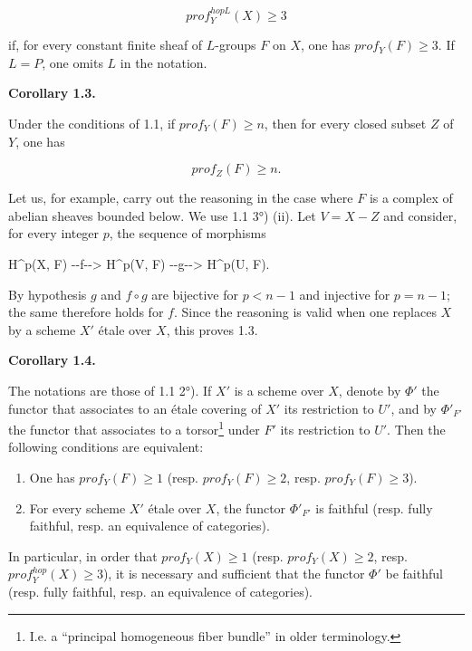 \documentclass[
]{article}
\newenvironment{Shaded}{}{}
\newcommand{\NormalTok}[1]{#1}
\begin{document}
\[
prof^{hopL}_{Y}(X) \geqslant 3
\]

if, for every constant finite sheaf of \(L\)-groups \(F\) on \(X\), one
has \(prof_{Y}(F) \geqslant 3\). If \(L = P\), one omits \(L\) in the
notation.

\textbf{Corollary 1.3.}

Under the conditions of 1.1, if \(prof_{Y}(F) \geqslant n\), then for
every closed subset \(Z\) of \(Y\), one has

\[
prof_{Z}(F) \geqslant n.
\]

Let us, for example, carry out the reasoning in the case where \(F\) is
a complex of abelian sheaves bounded below. We use 1.1 3°) (ii). Let
\(V = X - Z\) and consider, for every integer \(p\), the sequence of
morphisms

\begin{Shaded}
\begin{Highlighting}[]
\NormalTok{H\^{}p(X, F) {-}{-}f{-}{-}\textgreater{} H\^{}p(V, F) {-}{-}g{-}{-}\textgreater{} H\^{}p(U, F).}
\end{Highlighting}
\end{Shaded}

By hypothesis \(g\) and \(f \circ g\) are bijective for \(p < n - 1\)
and injective for \(p = n - 1\); the same therefore holds for \(f\).
Since the reasoning is valid when one replaces \(X\) by a scheme \(X'\)
étale over \(X\), this proves 1.3.

\textbf{Corollary 1.4.}

The notations are those of 1.1 2°). If \(X'\) is a scheme over \(X\),
denote by \(\Phi'\) the functor that associates to an étale covering of
\(X'\) its restriction to \(U'\), and by \(\Phi'_{F'}\) the functor that
associates to a torsor\footnote{I.e. a ``principal homogeneous fiber
  bundle'' in older terminology.} under \(F'\) its restriction to
\(U'\). Then the following conditions are equivalent:

\begin{enumerate}
\def\labelenumi{(\roman{enumi})}
\item
  One has \(prof_{Y}(F) \geqslant 1\) (resp.
  \(prof_{Y}(F) \geqslant 2\), resp. \(prof_{Y}(F) \geqslant 3\)).
\item
  For every scheme \(X'\) étale over \(X\), the functor \(\Phi'_{F'}\)
  is faithful (resp. fully faithful, resp. an equivalence of
  categories).
\end{enumerate}

In particular, in order that \(prof_{Y}(X) \geqslant 1\) (resp.
\(prof_{Y}(X) \geqslant 2\), resp. \(prof^{hop}_{Y}(X) \geqslant 3\)),
it is necessary and sufficient that the functor \(\Phi'\) be faithful
(resp. fully faithful, resp. an equivalence of categories).
\end{document}

